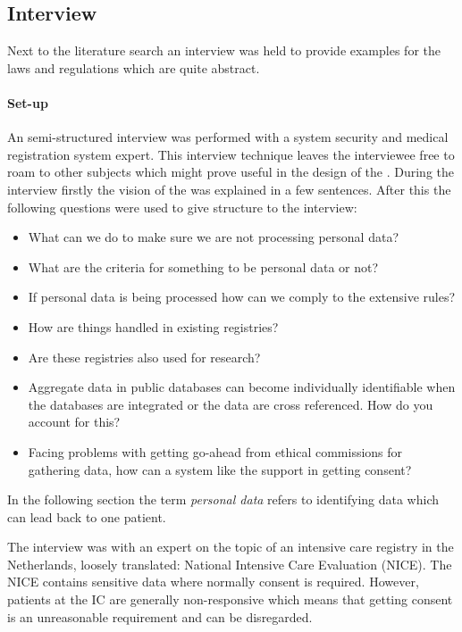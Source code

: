 \subsection{Interview}
\label{security-interviews}

Next to the literature search an interview was held to provide examples for the laws and regulations which are quite abstract.

\paragraph{Set-up} 
\label{security-set-up}

An semi-structured interview was performed with a system security and medical registration system expert.
This interview technique leaves the interviewee free to roam to other subjects which might prove useful in the design of the \ivfsystem{}.
During the interview firstly the vision of the \ivfsystem{} was explained in a few sentences.
After this the following questions were used to give structure to the interview:

\begin{itemize}
	\item What can we do to make sure we are not processing personal data?
	\item What are the criteria for something to be personal data or not?
	\item If personal data is being processed how can we comply to the extensive rules?
	\item How are things handled in existing registries?
	\item Are these registries also used for research?
	\item Aggregate data in public databases can become individually identifiable when the databases are integrated or the data are cross referenced. 
	How do you account for this?
	\item Facing problems with getting go-ahead from ethical commissions for gathering data, how can a system like the \ivfsystem{} support in getting consent?
\end{itemize}

In the following section the term \emph{personal data} refers to identifying data which can lead back to one patient.

The interview was with an expert on the topic of an intensive care registry in the Netherlands, loosely translated: National Intensive Care Evaluation (NICE).
The NICE contains sensitive data where normally consent is required. 
However, patients at the IC are generally non-responsive which means that getting consent is an unreasonable requirement and can be disregarded.

